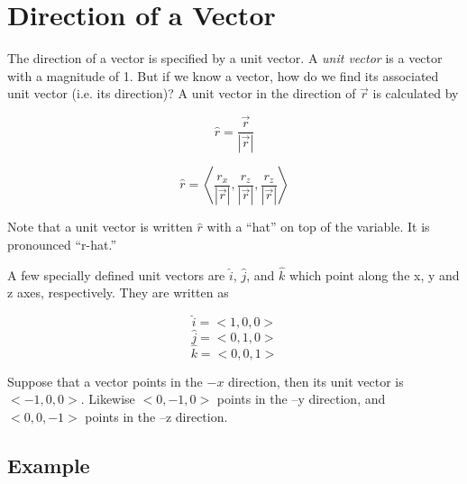 \section*{Direction of a Vector}

The direction of a vector is specified by a unit vector. A \emph{unit vector} is a vector with a magnitude of 1. But if we know a vector, how do we find its associated unit vector (i.e. its direction)?  A unit vector in the direction of $\vec{r}$ is calculated by

\begin{equation*}
	\hat{r} = \frac{\vec{r}}{|\vec{r}|}
\end{equation*}

\begin{equation*}
	\hat{r} = \left<\frac{r_x}{|\vec{r}|}, \frac{r_z}{|\vec{r}|}, \frac{r_z}{|\vec{r}|}\right>
\end{equation*}

Note that a unit vector is written $\hat{r}$ with a ``hat'' on top of the variable. It is pronounced ``r-hat.''

A few specially defined unit vectors are $\hat{i}$, $\hat{j}$, and $\hat{k}$ which point along the x, y and z axes, respectively. They are written as

\begin{equation*}
	\hat{i} = <1, 0, 0>
\end{equation*}
\begin{equation*}
	\hat{j} = <0, 1, 0>
\end{equation*}
\begin{equation*}
	\hat{k} = <0, 0, 1>
\end{equation*}

Suppose that a vector points in the $-x$ direction, then its unit vector is $<-1, 0, 0>$. Likewise $<0,-1,0>$ points in the --y direction, and $<0,0,-1>$ points in the --z direction.

\subsection*{Example}


